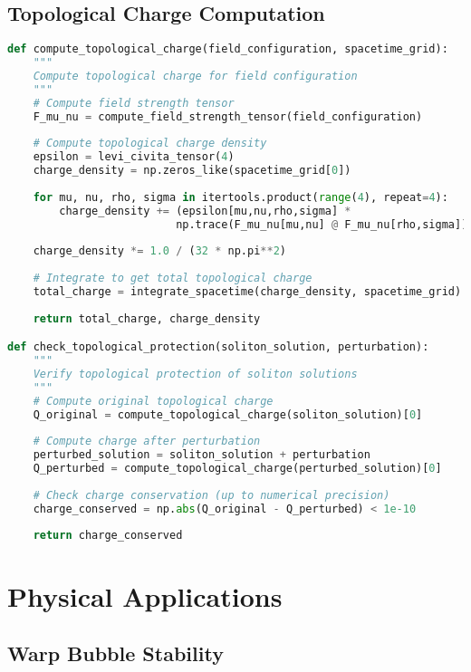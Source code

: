 \documentclass[12pt,a4paper]{article}
\begin{document}
\subsection{Topological Charge Computation}

\begin{lstlisting}[language=Python]
def compute_topological_charge(field_configuration, spacetime_grid):
    """
    Compute topological charge for field configuration
    """
    # Compute field strength tensor
    F_mu_nu = compute_field_strength_tensor(field_configuration)
    
    # Compute topological charge density
    epsilon = levi_civita_tensor(4)
    charge_density = np.zeros_like(spacetime_grid[0])
    
    for mu, nu, rho, sigma in itertools.product(range(4), repeat=4):
        charge_density += (epsilon[mu,nu,rho,sigma] * 
                          np.trace(F_mu_nu[mu,nu] @ F_mu_nu[rho,sigma]))
    
    charge_density *= 1.0 / (32 * np.pi**2)
    
    # Integrate to get total topological charge
    total_charge = integrate_spacetime(charge_density, spacetime_grid)
    
    return total_charge, charge_density

def check_topological_protection(soliton_solution, perturbation):
    """
    Verify topological protection of soliton solutions
    """
    # Compute original topological charge
    Q_original = compute_topological_charge(soliton_solution)[0]
    
    # Compute charge after perturbation
    perturbed_solution = soliton_solution + perturbation
    Q_perturbed = compute_topological_charge(perturbed_solution)[0]
    
    # Check charge conservation (up to numerical precision)
    charge_conserved = np.abs(Q_original - Q_perturbed) < 1e-10
    
    return charge_conserved
\end{lstlisting}

\section{Physical Applications}

\subsection{Warp Bubble Stability}
\end{document}
